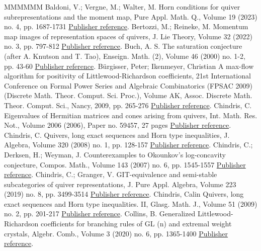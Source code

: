 \documentclass[11pt]{article}
\theoremstyle{definition}
\numberwithin{equation}{section}
\begin{document}
\begin{thebibliography}{MMMMMM}
 Baldoni, V.; Vergne, M.; Walter, M. Horn conditions for quiver subrepresentations and the moment map, Pure Appl. Math. Q., Volume 19 (2023) no. 4, pp. 1687-1731 \href{https://alco.centre-mersenne.org/articles/10.5802/alco.398/#Bal-Ver-Wal-2023}{Publisher reference}.
 Bertozzi, M.; Reineke, M. Momentum map images of representation spaces of quivers, J. Lie Theory, Volume 32 (2022) no. 3, pp. 797-812 \href{https://alco.centre-mersenne.org/articles/10.5802/alco.398/#Ber-Rei-2022}{Publisher reference}.
 Buch, A. S. The saturation conjecture (after A. Knutson and T. Tao), Enseign. Math. (2), Volume 46 (2000) no. 1-2, pp. 43-60 \href{https://alco.centre-mersenne.org/articles/10.5802/alco.398/#Buch-2000}{Publisher reference}.
 Bürgisser, Peter; Ikenmeyer, Christian A max-flow algorithm for positivity of Littlewood-Richardson coefficients, 21st International Conference on Formal Power Series and Algebraic Combinatorics (FPSAC 2009) (Discrete Math. Theor. Comput. Sci. Proc.), Volume AK, Assoc. Discrete Math. Theor. Comput. Sci., Nancy, 2009, pp. 265-276 \href{https://alco.centre-mersenne.org/articles/10.5802/alco.398/#BI}{Publisher reference}.
 Chindris, C. Eigenvalues of Hermitian matrices and cones arising from quivers, Int. Math. Res. Not., Volume 2006 (2006), Paper no. 59457, 27 pages \href{https://alco.centre-mersenne.org/articles/10.5802/alco.398/#CC4}{Publisher reference}.
 Chindris, C. Quivers, long exact sequences and Horn type inequalities, J. Algebra, Volume 320 (2008) no. 1, pp. 128-157 \href{https://alco.centre-mersenne.org/articles/10.5802/alco.398/#CC1}{Publisher reference}.
 Chindris, C.; Derksen, H.; Weyman, J. Counterexamples to Okounkov’s log-concavity conjecture, Compos. Math., Volume 143 (2007) no. 6, pp. 1545-1557 \href{https://alco.centre-mersenne.org/articles/10.5802/alco.398/#CDW}{Publisher reference}.
 Chindris, C.; Granger, V. GIT-equivalence and semi-stable subcategories of quiver representations, J. Pure Appl. Algebra, Volume 223 (2019) no. 8, pp. 3499-3514 \href{https://alco.centre-mersenne.org/articles/10.5802/alco.398/#ChiGra-2019}{Publisher reference}.
 Chindris, Calin Quivers, long exact sequences and Horn type inequalities. II, Glasg. Math. J., Volume 51 (2009) no. 2, pp. 201-217 \href{https://alco.centre-mersenne.org/articles/10.5802/alco.398/#CC2}{Publisher reference}.
 Collins, B. Generalized Littlewood-Richardson coefficients for branching rules of  GL (n) and extremal weight crystals, Algebr. Comb., Volume 3 (2020) no. 6, pp. 1365-1400 \href{https://alco.centre-mersenne.org/articles/10.5802/alco.398/#Col20}{Publisher reference}.

\end{thebibliography}
\end{document}
